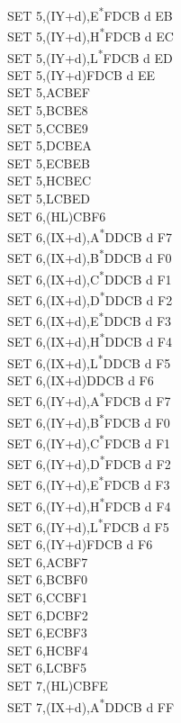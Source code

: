 \documentclass[oneside,a4paper]{book}
\begin{document}
\begin{multicols}{3}
{\begin{tabbing}
SET 5,(IY+d),E\textsuperscript{*}\>FDCB d EB\\
SET 5,(IY+d),H\textsuperscript{*}\>FDCB d EC\\
SET 5,(IY+d),L\textsuperscript{*}\>FDCB d ED\\
SET 5,(IY+d)\>FDCB d EE\\
SET 5,A\>CBEF\\
SET 5,B\>CBE8\\
SET 5,C\>CBE9\\
SET 5,D\>CBEA\\
SET 5,E\>CBEB\\
SET 5,H\>CBEC\\
SET 5,L\>CBED\\
SET 6,(HL)\>CBF6\\
SET 6,(IX+d),A\textsuperscript{*}\>DDCB d F7\\
SET 6,(IX+d),B\textsuperscript{*}\>DDCB d F0\\
SET 6,(IX+d),C\textsuperscript{*}\>DDCB d F1\\
SET 6,(IX+d),D\textsuperscript{*}\>DDCB d F2\\
SET 6,(IX+d),E\textsuperscript{*}\>DDCB d F3\\
SET 6,(IX+d),H\textsuperscript{*}\>DDCB d F4\\
SET 6,(IX+d),L\textsuperscript{*}\>DDCB d F5\\
SET 6,(IX+d)\>DDCB d F6\\
SET 6,(IY+d),A\textsuperscript{*}\>FDCB d F7\\
SET 6,(IY+d),B\textsuperscript{*}\>FDCB d F0\\
SET 6,(IY+d),C\textsuperscript{*}\>FDCB d F1\\
SET 6,(IY+d),D\textsuperscript{*}\>FDCB d F2\\
SET 6,(IY+d),E\textsuperscript{*}\>FDCB d F3\\
SET 6,(IY+d),H\textsuperscript{*}\>FDCB d F4\\
SET 6,(IY+d),L\textsuperscript{*}\>FDCB d F5\\
SET 6,(IY+d)\>FDCB d F6\\
SET 6,A\>CBF7\\
SET 6,B\>CBF0\\
SET 6,C\>CBF1\\
SET 6,D\>CBF2\\
SET 6,E\>CBF3\\
SET 6,H\>CBF4\\
SET 6,L\>CBF5\\
SET 7,(HL)\>CBFE\\
SET 7,(IX+d),A\textsuperscript{*}\>DDCB d FF\\

\end{tabbing}}
\end{multicols}
\end{document}
